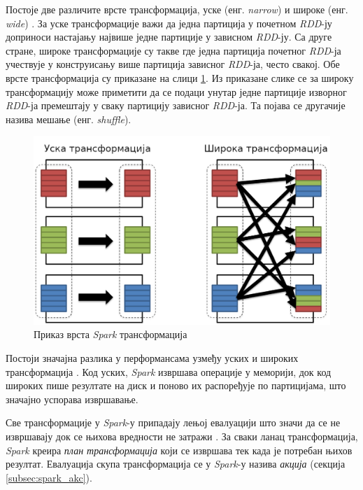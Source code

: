 \documentclass[12pt,oneside]{memoir}
\begin{document}
Постоје две различите врсте трансформација, уске (енг. \textit{narrow}) и широке (енг. \textit{wide}) \cite{spark_guide}. За уске трансформације важи да једна партиција у почетном \textit{RDD}-ју доприноси настајању највише једне партиције у зависном \textit{RDD}-ју. Са друге стране, широке трансформације су такве где једна партиција почетног \textit{RDD}-ја учествује у конструисању више партиција зависног \textit{RDD}-ја, често свакој. Обе врсте трансформација су приказане на слици \ref{fig:sprk_trnsf}. Из приказане слике се за широку трансформацију може приметити да се подаци унутар једне партиције изворног \textit{RDD}-ја премештају у сваку партицију зависног \textit{RDD}-ја. Та појава се другачије назива мешање (енг. \textit{shuffle}).

\begin{figure}[!ht]
  \centering
  \includegraphics[width=1\textwidth]{pictures/spark_transformation_types.png}
  \caption{Приказ врста \textit{Spark} трансформација}
  \label{fig:sprk_trnsf}
\end{figure}

Постоји значајна разлика у перформансама узмеђу уских и широких трансформација \cite{spark_guide}. Код уских, \textit{Spark} извршава операције у меморији, док код широких пише резултате на диск и поново их распоређује по партицијама, што значајно успорава извршавање.

Све трансформације у \textit{Spark}-у припадају лењој евалуацији што значи да се не извршавају док се њихова вредности не затражи \cite{spark_guide}. За сваки ланац трансформација, \textit{Spark} креира \textit{план трансформација} који се извршава тек када је потребан њихов резултат. Евалуација скупа трансформација се у \textit{Spark}-у назива \textit{акција} (секција \ref{subsec:spark_akc}).
\end{document}
